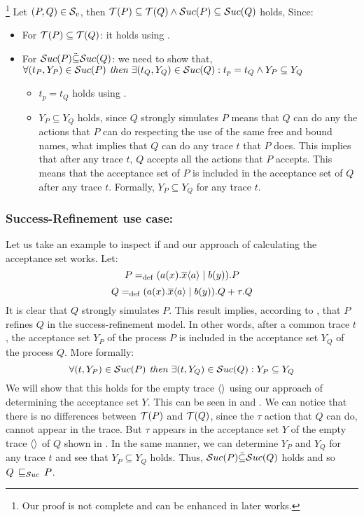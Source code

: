 \begin{prf}\footnote{Our proof is not complete and can be enhanced in later works.}
Let $(P,Q)\in{}\mathcal{S}_v$, then $\Traces[P]\subseteq\Traces[Q] \wedge \Successes[P]\subseteq\Successes[Q]$ holds, Since:
\begin{itemize}
\item For $\Traces[P]\subseteq\Traces[Q]$: it holds using .
\item For $\Successes[P]\ddot{\subseteq}\Successes[Q]$: we need to show that,\\$\forall (t_P, Y_P) \in \Successes[P] \textit{ then } \exists (t_Q, Y_Q) \in \Successes[Q]: t_p = t_Q \wedge Y_P \subseteq Y_Q$
\begin{itemize}
\item $t_p = t_Q$ holds using .
\item $Y_P \subseteq Y_Q$ holds, since $Q$ strongly simulates $P$ means that $Q$ can do any the actions that $P$ can do respecting the use of the same free and bound names, what implies that $Q$ can do any trace $t$ that $P$ does. This implies that after any trace $t$, $Q$ accepts all the actions that $P$ accepts. This means that the acceptance set of $P$ is included in the acceptance set of $Q$ after any trace $t$. Formally, $Y_P \subseteq Y_Q$ for any trace $t$.
\end{itemize}
\end{itemize}
\end{prf}
\subsubsection{Success-Refinement use case:}
Let us take an example to inspect if  and our approach of calculating the acceptance set works. Let:\\
\[P=_{\mathrm{def}}(a(x).\overline{x}\langle a\rangle \mid b(y)).P\]  
\[Q=_{\mathrm{def}}(a(x).\overline{x}\langle a\rangle \mid b(y)).Q + \tau.Q\]
It is clear that $Q$ strongly simulates $P$. This result implies, according to , that $P$ refines $Q$ in the success-refinement model. In other words, after a common trace $t$, the acceptance set $Y_P$ of the process $P$ is included in the acceptance set $Y_Q$ of the process $Q$. More formally:
\[\forall (t, Y_P) \in \Successes[P] \textit{ then } \exists (t, Y_Q) \in \Successes[Q]: Y_P \subseteq Y_Q\]
We will show that this holds for the empty trace $\overline{}\langle\rangle$ using our approach of determining the acceptance set $Y$.
This can be seen in  and . We can notice that there is no differences between $\Traces[P]$ and $\Traces[Q]$, since the $\tau$ action that $Q$ can do, cannot appear in the trace. But $\tau$ appears in the acceptance set $Y$ of the empty trace $\overline{}\langle\rangle$ of $Q$ shown in . In the same manner, we can determine $Y_P$ and $Y_Q$ for any trace $t$ and see that $Y_P \subseteq Y_Q$ holds. Thus, $\Successes[P]\ddot{\subseteq}\Successes[Q]$ holds and so $Q \refiSuc P$.

